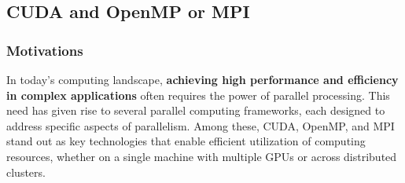 \subsection{CUDA and OpenMP or MPI}

\subsubsection{Motivations}

In today's computing landscape, \textbf{achieving high performance and efficiency in complex applications} often requires the power of parallel processing. This need has given rise to several parallel computing frameworks, each designed to address specific aspects of parallelism. Among these, CUDA, OpenMP, and MPI stand out as key technologies that enable efficient utilization of computing resources, whether on a single machine with multiple GPUs or across distributed clusters.

